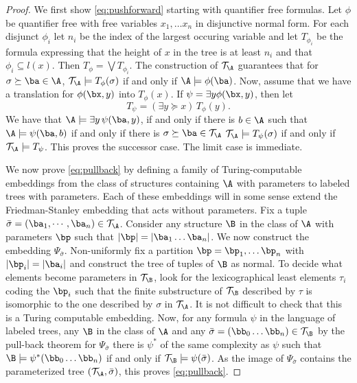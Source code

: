 \documentclass{amsart}
\newcommand{\T}{{\mathcal{T}}}
\begin{document}
\begin{proof}
   We first show \cref{eq:pushforward} starting with quantifier free formulas.
   Let $\phi$ be quantifier free with free variables $x_1,\dots x_n$ in
   disjunctive normal form. For each disjunct $\phi_i$ let $n_i$ be the index of
   the largest occuring variable and let $T_{\phi_i}$ be the formula expressing
   that the height of $x$ in the tree is at least $n_i$ and that
   $\phi_i\subseteq l(x)$. Then $T_\phi=\bigvee T_{\phi_i}$. The construction of
   $\T_\A$ guarantees that for $\sigma\succeq\ba\in \A$, $\T_\A\models
   T_\phi(\sigma)$ if and only if $\A\models \phi(\ba)$. Now, assume that we
   have a translation for $\phi(\bx,y)$ into $T_\phi(x)$. If $\psi=\exists y
   \phi(\bx,y)$, then let \[T_\psi= (\exists y\succeq x)\, T_\phi(y).\] We have
   that $\A\models \exists y\,\psi(\ba,y)$, if and only if there is $b\in \A$
   such that $\A\models\psi(\ba,b)$ if and only if there is $\sigma\succeq \ba
   \in \T_\A$ $\T_\A\models T_\psi(\sigma)$ if and only if $\T_\A\models
   T_\psi$. This proves the successor case. The limit case is immediate.

   We now prove \cref{eq:pullback} by defining a family of Turing-computable
   embeddings from the class of structures containing $\A$ with parameters to
   labeled trees with parameters. Each of these embeddings will in some sense
   extend the Friedman-Stanley embedding that acts without parameters. Fix a
   tuple $\bar\sigma=(\ba_1,\cdots,\ba_n)\in \T_\A$. Consider any structure $\B$
   in the class of $\A$ with parameters $\bp$ such that
   $|\bp|=|\ba_1\dots\ba_n|$. We now construct the embedding
   $\Psi_{\bar\sigma}$. Non-uniformly fix a partition
   $\bp=\bp_1,\dots\bp_n$ with $|\bp_i|=|\ba_i|$ and construct the tree of
   tuples of $\B$ as normal. To decide what elements become parameters in
   $\T_\B$, look for the lexicographical least elements $\tau_i$ coding the
   $\bp_i$ such that the finite substructure of $\T_\B$ described by $\tau$ is
   isomorphic to the one described by $\sigma$ in $\T_\A$. It is not difficult to check that this is a Turing computable
   embedding. Now, for any formula $\psi$ in the language of labeled trees, any
   $\B$ in the class of $\A$ and any $\bar\sigma=(\bb_0\dots\bb_n)\in \T_\B$ by
   the pull-back theorem for $\Psi_{\bar\sigma}$ there is $\psi^*$ of the same
   complexity as $\psi$ such that $\B\models \psi^*(\bb_0\dots\bb_n)$ if and
   only if $\T_\B\models \psi(\bar\sigma)$. As the image of $\Psi_{\bar\sigma}$
   contains the parameterized tree $(\T_\A,\bar\sigma)$, this proves
   \cref{eq:pullback}.
\end{proof}
\end{document}

